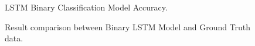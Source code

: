 \begin{figure}[H]
\begin{center}
\end{center}
\decoRule
\caption[LSTM Binary Classification Model Accuracy]{LSTM Binary Classification Model Accuracy.}
\label{fig:binary-lstm-acc}
\end{figure}

\begin{figure}[H]
\begin{center}
\end{center}
\decoRule
\caption[Result comparison between Binary LSTM Model and Ground Truth data]{Result comparison between Binary LSTM Model and Ground Truth data.}
\label{fig:binary-lstm-results}
\end{figure}


